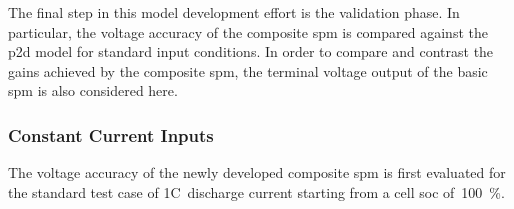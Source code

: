 The final  step in  this model  development effort is  the validation  phase. In
particular, the voltage accuracy of  the composite \gls{spm} is compared against
the  \gls{p2d} model  for standard  input conditions.  In order  to compare  and
contrast the  gains achieved  by the composite  \gls{spm}, the  terminal voltage
output of the basic \gls{spm} is also considered here.

\subsubsection*{Constant Current Inputs}

The  voltage  accuracy of  the  newly  developed  composite \gls{spm}  is  first
evaluated for  the standard test  case of 1C~discharge current starting  from a
cell \gls{soc} of~\SI{100}{\percent}.

